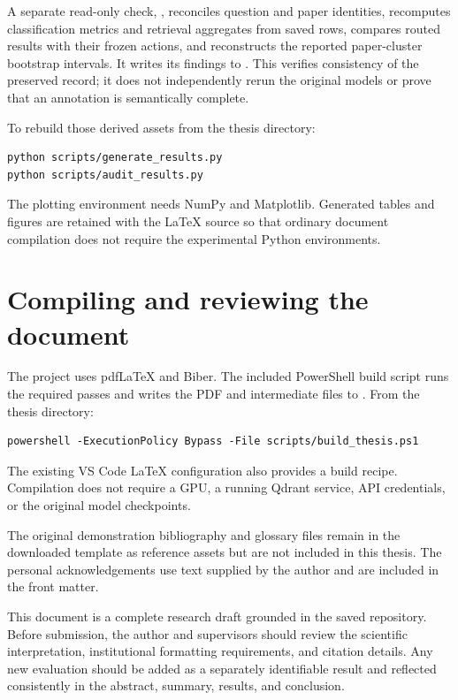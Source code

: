 A separate read-only check, , reconciles
question and paper identities, recomputes classification metrics and
retrieval aggregates from saved rows, compares routed results with
their frozen actions, and reconstructs the reported paper-cluster
bootstrap intervals. It writes its findings to
. This verifies consistency of the
preserved record; it does not independently rerun the original models
or prove that an annotation is semantically complete.

To rebuild those derived assets from the thesis directory:
\begin{verbatim}
python scripts/generate_results.py
python scripts/audit_results.py
\end{verbatim}
The plotting environment needs NumPy and Matplotlib. Generated
tables and figures are retained with the LaTeX source so that
ordinary document compilation does not require the experimental
Python environments.

\section{Compiling and reviewing the document}
The project uses pdfLaTeX and Biber. The included PowerShell
build script runs the required passes and writes the PDF and
intermediate files to . From the thesis directory:
\begin{verbatim}
powershell -ExecutionPolicy Bypass -File scripts/build_thesis.ps1
\end{verbatim}
The existing VS Code LaTeX configuration also provides a build
recipe. Compilation does not require a GPU, a running Qdrant
service, API credentials, or the original model checkpoints.

The original demonstration bibliography and glossary files remain
in the downloaded template as reference assets but are not included
in this thesis. The personal acknowledgements use text supplied by
the author and are included in the front matter.

This document is a complete research draft grounded in the saved
repository. Before submission, the author and supervisors should
review the scientific interpretation, institutional formatting
requirements, and citation details. Any new evaluation should be
added as a separately identifiable result and reflected consistently
in the abstract, summary, results, and conclusion.
